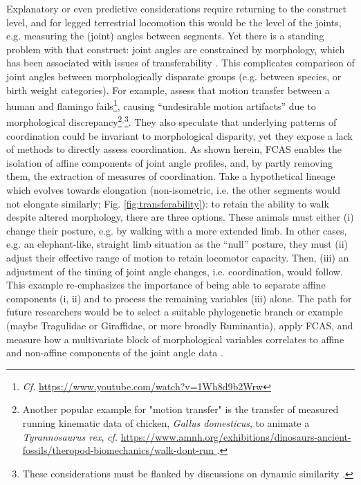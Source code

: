 Explanatory or even predictive considerations require returning to the construct level, and for legged terrestrial locomotion this would be the level of the joints, e.g. measuring the (joint) angles between segments.
Yet there is a standing problem with that construct: joint angles are constrained by morphology, which has been associated with issues of transferability \citep{Gatesy2011}.
This complicates comparison of joint angles between morphologically disparate groups (e.g. between species, or birth weight categories).
For example, \citet{Gatesy2011} assess that motion transfer between a human and flamingo fails\footnote{\textit{Cf.} \url{https://www.youtube.com/watch?v=1Wh8d9b2Wrw}}, causing ``undesirable motion artifacts'' due to morphological discrepancy\footnote{Another popular example for "motion transfer" is the transfer of measured running kinematic data of chicken, \textit{Gallus domesticus}, to animate a \textit{Tyrannosaurus rex}, \textit{cf.} \url{https://www.amnh.org/exhibitions/dinosaurs-ancient-fossils/theropod-biomechanics/walk-dont-run }.}\(^,\)\footnote{These considerations must be flanked by discussions on dynamic similarity \citep{Aerts2023}.}.
They also speculate that underlying patterns of coordination could be invariant to morphological disparity, yet they expose a lack of methods to directly assess coordination.
As shown herein, FCAS enables the isolation of affine components of joint angle profiles, and, by partly removing them, the extraction of measures of coordination.
Take a hypothetical lineage which evolves towards elongation  (non-isometric, i.e. the other segments would not elongate similarly; Fig. \ref{fig:transferability}): to retain the ability to walk despite altered morphology, there are three options.
These animals must either (i) change their posture, e.g. by walking with a more extended limb.
In other cases, e.g. an elephant-like, straight limb situation as the ``null'' posture, they must (ii) adjust their effective range of motion to retain locomotor capacity.
Then, (iii) an adjustment of the timing of joint angle changes, i.e. coordination, would follow.
This example re-emphasizes the importance of being able to separate affine components (i, ii) and to process the remaining variables (iii) alone.
The path for future researchers would be to select a suitable phylogenetic branch or example (maybe Tragulidae or Giraffidae, or more broadly Ruminantia), apply FCAS, and measure how a multivariate block of morphological variables correlates to affine and non-affine components of the joint angle data \citep[a suitable method might be Two-Block Partial Least Squares,][]{Rohlf2000}.
